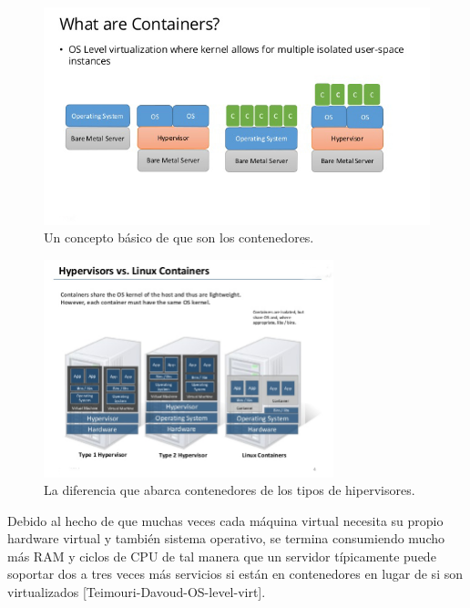 \begin{figure}
  \begin{center}
      \includegraphics[width=\textwidth]{Figures/que-son-contenedores.jpg}
  \end{center}
  \caption{Un concepto básico de que son los contenedores.} 
  \label{que-son-contenedores}
\end{figure}

\begin{figure}
  \begin{center}
      \includegraphics[width=0.75\textwidth]{Figures/differencia-hipervisores-contenedores.png}
  \end{center}
  \caption{La diferencia que abarca contenedores de los tipos de hipervisores.} 
  \label{differencia-hipervisores-contenedores}
\end{figure}

Debido al hecho de que muchas veces cada máquina virtual necesita su propio hardware virtual y también sistema operativo, se termina consumiendo mucho más RAM y ciclos de CPU de tal manera que un servidor típicamente puede soportar dos a tres veces más servicios si están en contenedores en lugar de si son virtualizados [Teimouri-Davoud-OS-level-virt].

